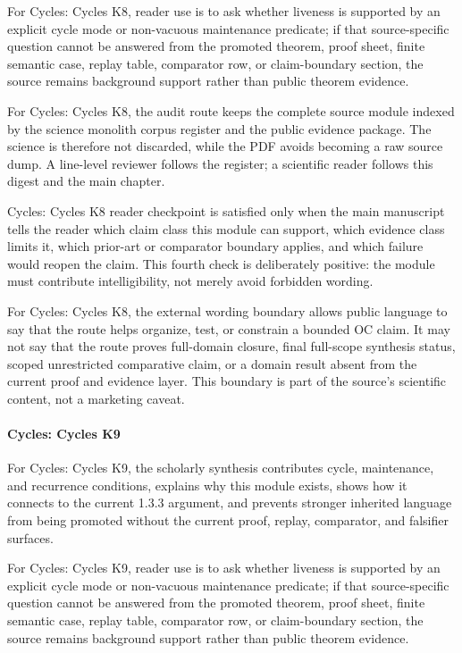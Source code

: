 For Cycles: Cycles K8, reader use is to ask whether liveness is supported by an explicit cycle mode or non-vacuous maintenance predicate; if that source-specific question cannot be answered from the promoted theorem, proof sheet, finite semantic case, replay table, comparator row, or claim-boundary section, the source remains background support rather than public theorem evidence.


For Cycles: Cycles K8, the audit route keeps the complete source module indexed by the science monolith corpus register and the public evidence package. The science is therefore not discarded, while the PDF avoids becoming a raw source dump. A line-level reviewer follows the register; a scientific reader follows this digest and the main chapter.


Cycles: Cycles K8 reader checkpoint is satisfied only when the main manuscript tells the reader which claim class this module can support, which evidence class limits it, which prior-art or comparator boundary applies, and which failure would reopen the claim. This fourth check is deliberately positive: the module must contribute intelligibility, not merely avoid forbidden wording.


For Cycles: Cycles K8, the external wording boundary allows public language to say that the route helps organize, test, or constrain a bounded OC claim. It may not say that the route proves full-domain closure, final full-scope synthesis status, scoped unrestricted comparative claim, or a domain result absent from the current proof and evidence layer. This boundary is part of the source's scientific content, not a marketing caveat.


\paragraph{Cycles: Cycles K9}

For Cycles: Cycles K9, the scholarly synthesis contributes cycle, maintenance, and recurrence conditions, explains why this module exists, shows how it connects to the current 1.3.3 argument, and prevents stronger inherited language from being promoted without the current proof, replay, comparator, and falsifier surfaces.


For Cycles: Cycles K9, reader use is to ask whether liveness is supported by an explicit cycle mode or non-vacuous maintenance predicate; if that source-specific question cannot be answered from the promoted theorem, proof sheet, finite semantic case, replay table, comparator row, or claim-boundary section, the source remains background support rather than public theorem evidence.


